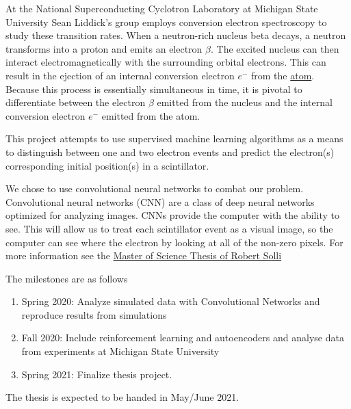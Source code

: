 \documentclass[%
oneside,                 %
final,                   %
10pt]{article}
\begin{document}
At the National Superconducting Cyclotron Laboratory at Michigan State University Sean Liddick's group employs conversion electron spectroscopy to study
these transition rates. When a neutron-rich nucleus beta decays, a
neutron transforms into a proton and emits an electron $\beta$. The
excited nucleus can then interact electromagnetically with the
surrounding orbital electrons. This can result in the ejection of an
internal conversion electron $e^{-}$ from the
\href{{https://www.sciencedirect.com/science/article/pii/S0065253908608884}}{atom}.
Because this process is essentially simultaneous in time, it is pivotal
to differentiate between the electron $\beta$ emitted from the
nucleus and the internal conversion electron $e^{-}$ emitted from
the atom.

This project attempts to use supervised machine learning algorithms as a
means to distinguish between one and two electron events and predict the
electron(s) corresponding initial position(s) in a scintillator.


We chose to use convolutional neural networks to combat our problem.
Convolutional neural networks (CNN) are a class of deep neural networks
optimized for analyzing images. CNNs provide the computer with the
ability to see. This will allow us to treat each scintillator event as a
visual image, so the computer can see where the electron by looking at
all of the non-zero pixels. 
For more information see the \href{{https://github.com/copperwire/thesis/blob/master/main.pdf}}{Master of Science Thesis of Robert Solli}

The milestones are as follows
\begin{enumerate}
\item Spring 2020: Analyze simulated data with Convolutional Networks and reproduce results from simulations

\item Fall 2020: Include reinforcement learning and autoencoders and analyse data from experiments at Michigan State University

\item Spring 2021: Finalize thesis project.
\end{enumerate}

\noindent
The thesis is expected to be handed in May/June  2021.



\end{document}
